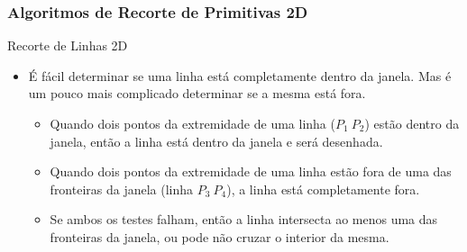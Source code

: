 \documentclass{beamer}
\begin{document}
\begin{frame}
\frametitle{Algoritmos de Recorte de Primitivas 2D}

	\begin{block}{Recorte de Linhas 2D}
		\begin{itemize}
			\item É fácil determinar se uma linha está completamente dentro da janela. Mas é um pouco mais complicado determinar se a mesma está fora.
			\begin{itemize}
				\item<1-> Quando dois pontos da extremidade de uma linha ($P_1 \: P_2$) estão dentro da janela, então a linha está dentro da janela e será desenhada.
				\item<2-> Quando dois pontos da extremidade de uma linha estão fora de uma das fronteiras da janela (linha $P_3 \: P_4$), a linha está completamente fora.
				\item<3-> Se ambos os testes falham, então a linha intersecta ao menos uma das fronteiras da janela, ou pode não cruzar o interior da mesma. 
			\end{itemize}
		\end{itemize}
	\end{block}
			
\end{frame}
\end{document}
